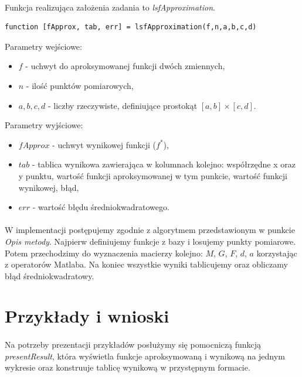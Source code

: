 \documentclass{article}
\begin{document}
\paragraph{}
Funkcja realizująca założenia zadania to \textit{lsfApproximation}.
\begin{lstlisting}[style=Matlab-editor]
function [fApprox, tab, err] = lsfApproximation(f,n,a,b,c,d)
\end{lstlisting}
\vspace{4pt}
Parametry wejściowe:
\begin{itemize}
\item $f$ - uchwyt do aproksymowanej funkcji dwóch zmiennych,
\item $n$ - ilość punktów pomiarowych,
\item $a,b,c,d$ - liczby rzeczywiste, definiujące prostokąt $[a,b]\times[c,d]$.
\end{itemize}
Parametry wyjściowe:
\begin{itemize}
\item $fApprox$ - uchwyt wynikowej funkcji ($f^*$),
\item $tab$ - tablica wynikowa zawierająca w kolumnach kolejno: współrzędne x oraz y punktu, wartość funkcji aproksymowanej w tym punkcie, wartość funkcji wynikowej, błąd,
\item $err$ - wartość błędu średniokwadratowego.
\end{itemize}
\paragraph{}
W implementacji postępujemy zgodnie z algorytmem przedstawionym w punkcie \textit{Opis metody}. Najpierw definiujemy funkcje z bazy i losujemy punkty pomiarowe. Potem przechodzimy do wyznaczenia macierzy kolejno: $M$, $G$, $F$, $d$, $a$ korzystając z operatorów Matlaba. Na koniec wszystkie wyniki tablicujemy oraz obliczamy błąd średniokwadratowy. 
\section{Przykłady i wnioski}
\paragraph{}
Na potrzeby prezentacji przykładów posłużymy się pomocniczą funkcją \textit{presentResult}, która wyświetla funkcje aproksymowaną i wynikową na jednym wykresie oraz konstruuje tablicę wynikową w przystępnym formacie.
\end{document}
